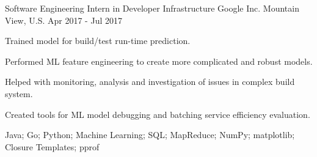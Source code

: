 

\begin{cventries}


  \cventry
    {Software Engineering Intern in Developer Infrastructure} %
    {Google Inc.} %
    {Mountain View, U.S.} %
    {Apr 2017 - Jul 2017} %
    {
      \begin{cvitems} %
        \item {Trained model for build/test run-time prediction.}
        \item {Performed ML feature engineering to create more complicated and robust models.}
        \item {Helped with monitoring, analysis and investigation of issues in complex build system.}
        \item {Created tools for ML model debugging and batching service efficiency evaluation.}
        \item {Java; Go; Python; Machine Learning; SQL; MapReduce; NumPy; matplotlib; Closure Templates; pprof}
      \end{cvitems}
    }


\end{cventries}
